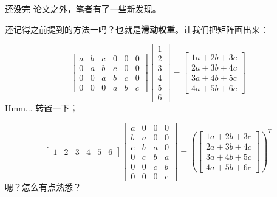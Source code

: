 \documentclass[aspectratio=169,10pt]{beamer}
\begin{document}
\begin{frame}[fragile,shrink=5]{还没完}
论文之外，笔者有了一些新发现。
\par
还记得之前提到的方法一吗？也就是\textbf{滑动权重}。让我们把矩阵画出来：
\par
\[
\begin{bmatrix}
a&b&c&0&0&0\\
0&a&b&c&0&0\\
0&0&a&b&c&0\\
0&0&0&a&b&c
\end{bmatrix}
\begin{bmatrix}
1\\
2\\
3\\
4\\
5\\
6
\end{bmatrix}
=
\begin{bmatrix}
1a+2b+3c\\
2a+3b+4c\\
3a+4b+5c\\
4a+5b+6c
\end{bmatrix}
\]
Hmm... 转置一下；
\par
\[
\begin{bmatrix}
1&2&3&4&5&6
\end{bmatrix}
\begin{bmatrix}
a&0&0&0\\
b&a&0&0\\
c&b&a&0\\
0&c&b&a\\
0&0&c&b\\
0&0&0&c
\end{bmatrix}
=
\left(
\begin{bmatrix}
1a+2b+3c\\
2a+3b+4c\\
3a+4b+5c\\
4a+5b+6c
\end{bmatrix}
\right)^T
\]
嗯？怎么有点熟悉？
\par
\end{frame}
\end{document}
